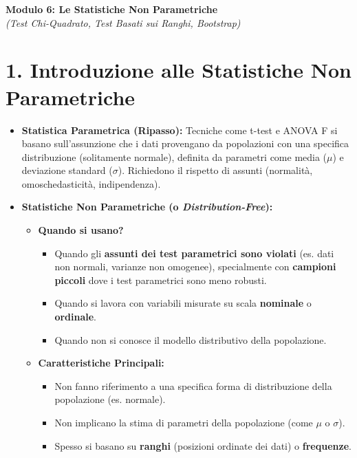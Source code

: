\documentclass[12pt, a4paper]{article}
\newcommand{\popmean}{\mu} %
\newcommand{\popsd}{\sigma} %
\begin{document}
\begin{center}
    \Large\textbf{Modulo 6: Le Statistiche Non Parametriche} \\
    \vspace{0.5cm}
    \large\textit{(Test Chi-Quadrato, Test Basati sui Ranghi, Bootstrap)}
\end{center}

\section*{1. Introduzione alle Statistiche Non Parametriche}
\begin{itemize}
    \item \textbf{Statistica Parametrica (Ripasso):} Tecniche come t-test e ANOVA F si basano sull'assunzione che i dati provengano da popolazioni con una specifica distribuzione (solitamente normale), definita da parametri come media ($\popmean$) e deviazione standard ($\popsd$). Richiedono il rispetto di assunti (normalità, omoschedasticità, indipendenza).
    \item \textbf{Statistiche Non Parametriche (o \textit{Distribution-Free}):}
        \begin{itemize}
            \item \textbf{Quando si usano?}
                \begin{itemize}
                    \item Quando gli \textbf{assunti dei test parametrici sono violati} (es. dati non normali, varianze non omogenee), specialmente con \textbf{campioni piccoli} dove i test parametrici sono meno robusti.
                    \item Quando si lavora con variabili misurate su scala \textbf{nominale} o \textbf{ordinale}.
                    \item Quando non si conosce il modello distributivo della popolazione.
                \end{itemize}
            \item \textbf{Caratteristiche Principali:}
                \begin{itemize}
                    \item Non fanno riferimento a una specifica forma di distribuzione della popolazione (es. normale).
                    \item Non implicano la stima di parametri della popolazione (come $\popmean$ o $\popsd$).
                    \item Spesso si basano su \textbf{ranghi} (posizioni ordinate dei dati) o \textbf{frequenze}.

\end{itemize}
\end{itemize}
\end{itemize}
\end{document}
